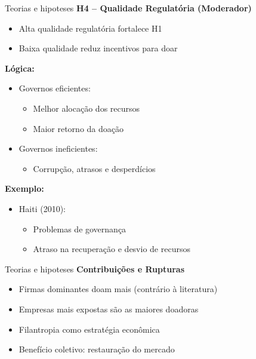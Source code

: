 \documentclass[
  10pt,
  ignorenonframetext,
  aspectratio=169,
  brazilian,
]{beamer}
\providecommand{\tightlist}{%
  \setlength{\itemsep}{0pt}\setlength{\parskip}{0pt}}
\begin{document}
\begin{frame}{Teorias e hipoteses}
\label{teorias-e-hipoteses-10}
\textbf{H4 – Qualidade Regulatória (Moderador)}

\begin{itemize}
\tightlist
\item
  Alta qualidade regulatória fortalece H1
\item
  Baixa qualidade reduz incentivos para doar
\end{itemize}

\textbf{Lógica:}

\begin{itemize}
\tightlist
\item
  Governos eficientes:

  \begin{itemize}
  \tightlist
  \item
    Melhor alocação dos recursos
  \item
    Maior retorno da doação
  \end{itemize}
\item
  Governos ineficientes:

  \begin{itemize}
  \tightlist
  \item
    Corrupção, atrasos e desperdícios
  \end{itemize}
\end{itemize}

\textbf{Exemplo:}

\begin{itemize}
\tightlist
\item
  Haiti (2010):

  \begin{itemize}
  \tightlist
  \item
    Problemas de governança
  \item
    Atraso na recuperação e desvio de recursos
  \end{itemize}
\end{itemize}
\end{frame}

\begin{frame}{Teorias e hipoteses}
\label{teorias-e-hipoteses-11}
\textbf{Contribuições e Rupturas}

\begin{itemize}
\tightlist
\item
  Firmas dominantes doam mais (contrário à literatura)
\item
  Empresas mais expostas são as maiores doadoras
\item
  Filantropia como estratégia econômica
\item
  Benefício coletivo: restauração do mercado
\end{itemize}
\end{frame}
\end{document}
